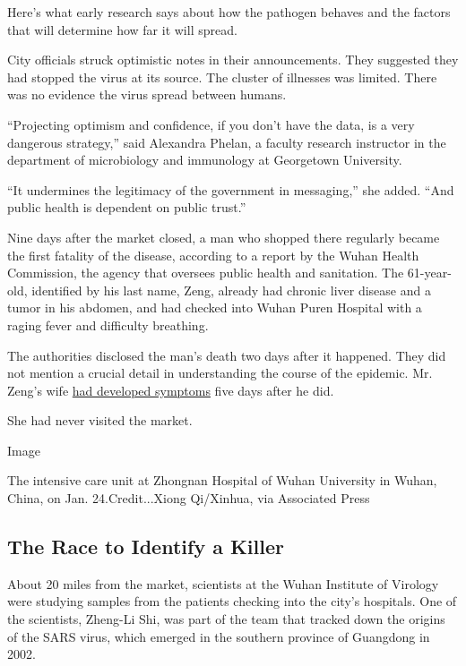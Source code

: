 Here's what early research says about how the pathogen behaves and the
factors that will determine how far it will spread.

City officials struck optimistic notes in their announcements. They
suggested they had stopped the virus at its source. The cluster of
illnesses was limited. There was no evidence the virus spread between
humans.

``Projecting optimism and confidence, if you don't have the data, is a
very dangerous strategy,'' said Alexandra Phelan, a faculty research
instructor in the department of microbiology and immunology at
Georgetown University.

``It undermines the legitimacy of the government in messaging,'' she
added. ``And public health is dependent on public trust.''

Nine days after the market closed, a man who shopped there regularly
became the first fatality of the disease, according to a report by the
Wuhan Health Commission, the agency that oversees public health and
sanitation. The 61-year-old, identified by his last name, Zeng, already
had chronic liver disease and a tumor in his abdomen, and had checked
into Wuhan Puren Hospital with a raging fever and difficulty breathing.

The authorities disclosed the man's death two days after it happened.
They did not mention a crucial detail in understanding the course of the
epidemic. Mr. Zeng's wife
\href{https://www.thelancet.com/journals/lancet/article/PIIS0140-6736(20)30183-5/fulltext}{had
developed symptoms} five days after he did.

She had never visited the market.

Image

The intensive care unit at Zhongnan Hospital of Wuhan University in
Wuhan, China, on Jan. 24.Credit...Xiong Qi/Xinhua, via Associated Press

\hypertarget{the-race-to-identify-a-killer}{%
\subsection{The Race to Identify a
Killer}\label{the-race-to-identify-a-killer}}

About 20 miles from the market, scientists at the Wuhan Institute of
Virology were studying samples from the patients checking into the
city's hospitals. One of the scientists, Zheng-Li Shi, was part of the
team that tracked down the origins of the SARS virus, which emerged in
the southern province of Guangdong in 2002.

